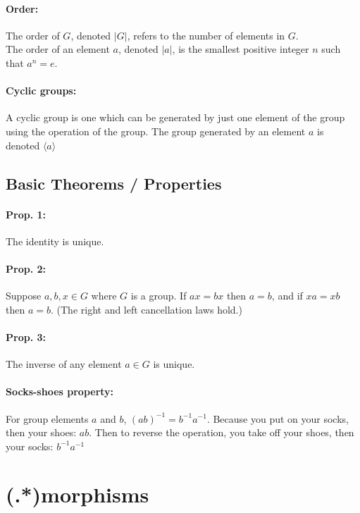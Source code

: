 \documentclass[11pt, letterpaper]{article}
\newcommand{\ord}[1]{\lvert{#1}\rvert}
\newcommand{\genby}[1]{\langle {#1} \rangle}
\newcommand{\inv}{^{-1}}
\begin{document}
		\paragraph{Order:}
			The order of $G$, denoted $\ord{G}$, refers to the number of elements in $G$. \\
			The order of an element $a$, denoted $\ord{a}$, is the smallest positive integer $n$ such that $a^n = e$.

		\paragraph{Cyclic groups:}
			A cyclic group is one which can be generated by just one element of the group using the operation of the group. 
			The group generated by an element $a$ is denoted $\genby{a}$


	\subsection{Basic Theorems / Properties}
		\paragraph{Prop. 1:}
			The identity is unique.

		\paragraph{Prop. 2:}
			Suppose $a, b, x \in G$ where $G$ is a group.
			If $ax = bx$ then $a = b$, and if $xa = xb$ then $a = b$.
			(The right and left cancellation laws hold.)

		\paragraph{Prop. 3:}
			The inverse of any element $a \in G$ is unique.

		\paragraph{Socks-shoes property:}
			For group elements $a$ and $b$, $(ab)\inv = b\inv a\inv$.
			Because you put on your socks, then your shoes: $ab$.
			Then to reverse the operation, you take off your shoes, then your socks: $b\inv a\inv $



\section{(.*)morphisms}
\end{document}

